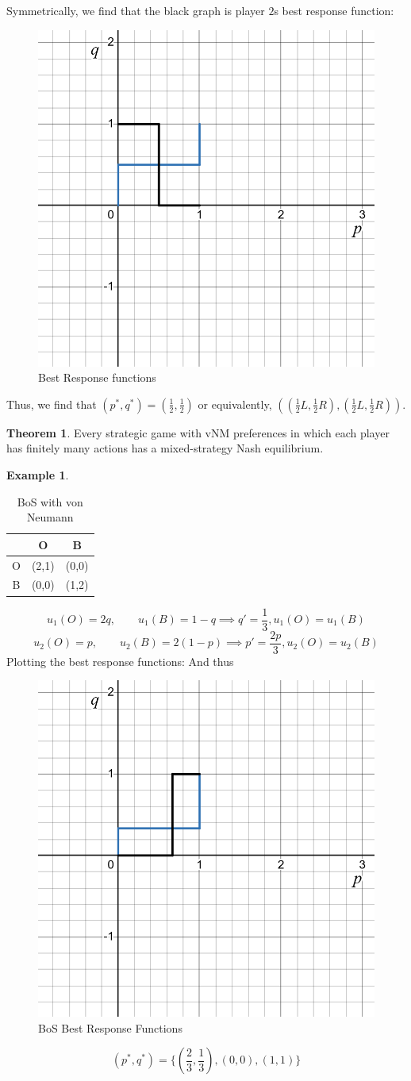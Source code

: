 \documentclass[10pt, oneside]{article}
\theoremstyle{definition}
\newtheorem{exmp}{Example}[section]
\newtheorem{thm}{Theorem}
\begin{document}
    Symmetrically, we find that the black graph is player $2$s best response function:
    \begin{figure}[H]
        \centering
        \includegraphics[width=0.25\linewidth]{Images/Notanazi.png}
        \caption{Best Response functions}
    \end{figure}
    Thus, we find that $(p^*, q^*) = (\frac{1}{2}, \frac{1}{2})$ or equivalently, $\left((\frac{1}{2}L, \frac{1}{2}R), (\frac{1}{2}L, \frac{1}{2}R)\right).$
\begin{thm}
    Every strategic game with vNM preferences in which each player has finitely many actions has a mixed-strategy Nash equilibrium.
\end{thm}
\begin{exmp}
    \begin{table}[H]
        \centering
        \begin{tabular}{c|c|c}
             & O & B\\
             \hline
             O& (2,1) & (0,0) \\
             \hline
             B&  (0,0)& (1,2)\\
        \end{tabular}
        \caption{BoS with von Neumann}
    \end{table}
    \[u_1(O) = 2q, \qquad u_1(B) = 1-q \implies q' = \frac{1}{3}, u_1(O) = u_1(B)\]
    \[u_2(O) = p, \qquad u_2(B) = 2(1-p) \implies p' = \frac{2p}{3}, u_2(O) = u_2(B)\] Plotting the best response functions:
     And thus 
\begin{figure}[H]
        \centering
        \includegraphics[width=0.5\linewidth]{Images/BoSvNM.png}
        \caption{BoS Best Response Functions}
    \end{figure}
        \[(p^*, q^*)  = \{(\frac{2}{3}, \frac{1}{3}), (0,0), (1,1)\}\]
\end{exmp}
\end{document}

